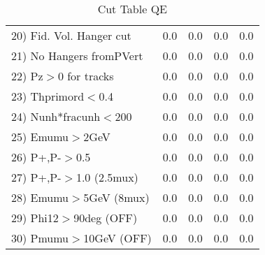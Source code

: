 \begin{table}[h!]
\begin{tabular}{||l||r|r|r|r||}
 20) Fid. Vol. Hanger cut &         0.0 &         0.0 &         0.0 &         0.0 \\
 21) No Hangers fromPVert &         0.0 &         0.0 &         0.0 &         0.0 \\
 22) Pz$>$0 for tracks    &         0.0 &         0.0 &         0.0 &         0.0 \\
 23) Thprimord$<$0.4      &         0.0 &         0.0 &         0.0 &         0.0 \\
 24) Nunh*fracunh$<$200   &         0.0 &         0.0 &         0.0 &         0.0 \\
 25) Emumu$>$2GeV         &         0.0 &         0.0 &         0.0 &         0.0 \\
 26) P+,P-$>$0.5          &         0.0 &         0.0 &         0.0 &         0.0 \\
 27) P+,P-$>$1.0 (2.5mux) &         0.0 &         0.0 &         0.0 &         0.0 \\
 28) Emumu$>$5GeV  (8mux) &         0.0 &         0.0 &         0.0 &         0.0 \\
 29) Phi12$>$90deg  (OFF) &         0.0 &         0.0 &         0.0 &         0.0 \\
 30) Pmumu$>$10GeV  (OFF) &         0.0 &         0.0 &         0.0 &         0.0 \\
 \hline
 \hline
 \end{tabular}
 \caption{Cut Table  QE     }
 \label{tab-cut____qe}
 \end{table}

